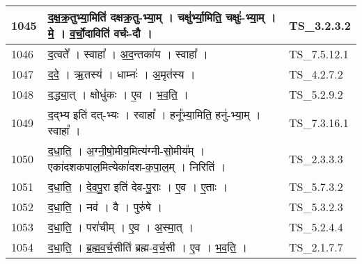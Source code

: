\documentclass[17pt]{extarticle}
\begin{document}
\begin{longtable}{||p{0.4in}||p{4.9in}||p{0.9in}||}
    \hline
        
    1045 & द॒क्ष॒क्र॒तुभ्या॒मिति॑ दक्षक्र॒तु{-}भ्या॒म्   ।   चक्षु॑र्भ्या॒मिति॒ चक्षुः॑{-}भ्या॒म्   ।   मे॒   ।   व॒र्चो॒दाविति॑ वर्चः{-}दौ   ।    & TS\_3.2.3.2       \\
    
    \hline
        
    1046 & द॒त्वते᳚   ।   स्वाहा᳚   ।   अ॒द॒न्तका॑य   ।   स्वाहा᳚   ।    & TS\_7.5.12.1       \\
    
    \hline
        
    1047 & द॒दे॒   ।   ऋ॒तस्य॑   ।   धाम्नः॑   ।   अ॒मृत॑स्य   ।    & TS\_4.2.7.2       \\
    
    \hline
        
    1048 & द॒द्ध्या॒त्   ।   क्षोधु॑कः   ।   ए॒व   ।   भ॒व॒ति॒   ।    & TS\_5.2.9.2       \\
    
    \hline
        
    1049 & द॒द्भ्य इति॑ दत्{-}भ्यः   ।   स्वाहा᳚   ।   हनू᳚भ्या॒मिति॒ हनु॑{-}भ्या॒म्   ।   स्वाहा᳚   ।    & TS\_7.3.16.1       \\
    
    \hline
        
    1050 & द॒धा॒ति॒   ।   अ॒ग्नी॒षो॒मीय॒मित्य॑ग्नी{-}सो॒मीय᳚म्   ।   एका॑दशकपाल॒मित्येका॑दश{-}क॒पा॒ल॒म्   ।   निरिति॑   ।    & TS\_2.3.3.3       \\
    
    \hline
        
    1051 & द॒धा॒ति॒   ।   दे॒व॒पु॒रा इति॑ देव{-}पु॒राः   ।   ए॒व   ।   ए॒ताः   ।    & TS\_5.7.3.2       \\
    
    \hline
        
    1052 & द॒धा॒ति॒   ।   नव॑   ।   वै   ।   पुरु॑षे   ।    & TS\_5.3.2.3       \\
    
    \hline
        
    1053 & द॒धा॒ति॒   ।   परा॑चीम्   ।   ए॒व   ।   अ॒स्मा॒त्   ।    & TS\_5.2.4.4       \\
    
    \hline
        
    1054 & द॒धा॒ति॒   ।   ब्र॒ह्म॒व॒र्च॒सीति॑ ब्रह्म{-}व॒र्च॒सी   ।   ए॒व   ।   भ॒व॒ति॒   ।    & TS\_2.1.7.7       \\
    
    \hline
        

\end{longtable}
\end{document}
